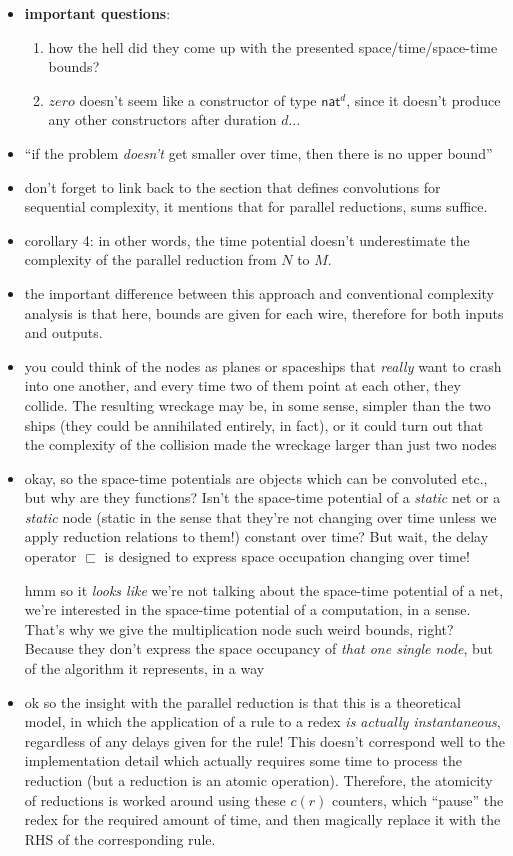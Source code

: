 \documentclass{fit-teorsem}
\begin{document}
\begin{itemize}
	\item \textbf{important questions}:
		\begin{enumerate}
			\item how the hell did they come up with the presented space/time/space-time bounds?
			\item $zero$ doesn't seem like a constructor of type $\mathsf{nat}^d$, since it doesn't
				produce any other constructors after duration $d$...
		\end{enumerate}
	\item ``if the problem \textit{doesn't} get smaller over time, then there is no upper bound''
	\item don't forget to link back to the section that defines convolutions for sequential complexity,
		it mentions that for parallel reductions, sums suffice.
	\item corollary 4: in other words, the time potential doesn't underestimate the complexity of the
		parallel reduction from $N$ to $M$.
	\item the important difference between this approach and conventional complexity analysis is that
		here, bounds are given for each wire, therefore for both inputs and outputs.
	\item you could think of the nodes as planes or spaceships that \textit{really} want to crash
		into one another, and every time two of them point at each other, they collide.
		The resulting wreckage may be, in some sense, simpler than the two ships (they could be
		annihilated entirely, in fact), or it could turn out that the complexity of the collision
		made the wreckage larger than just two nodes
	\item okay, so the space-time potentials are objects which can be convoluted etc., but why are they
		functions? Isn't the space-time potential of a \textit{static} net or a \textit{static} node
		(static in the sense that they're not changing over time unless we apply reduction relations
		to them!) constant over time? But wait, the delay operator $\sqsubset$ is designed to express
		space occupation changing over time!

		hmm so it \textit{looks like} we're not talking about the space-time potential of a net,
		we're interested in the space-time potential of a computation, in a sense. That's why
		we give the multiplication node such weird bounds, right? Because they don't express
		the space occupancy of \textit{that one single node}, but of the algorithm it represents,
		in a way
	\item ok so the insight with the parallel reduction is that this is a theoretical model, in which
		the application of a rule to a redex \textit{is actually instantaneous}, regardless of any
		delays given for the rule! This doesn't correspond well to the implementation detail
		which actually requires some time to process the reduction (but a reduction is an atomic
		operation). Therefore, the atomicity of reductions is worked around using these $c(r)$ counters,
		which ``pause'' the redex for the required amount of time, and then magically replace it with
		the RHS of the corresponding rule.
\end{itemize}
\end{document}
